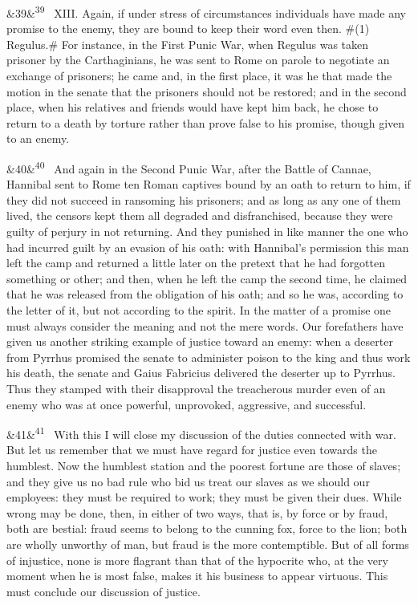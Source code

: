 \documentclass[12pt]{article}
\newcommand{\para}[1][]{\par\noindent\ifx&#1&\else\textsuperscript{\footnotesize #1}~\fi}
\begin{document}
\para[39] XIII. Again, if under stress of circumstances individuals have made any promise to the enemy, they are bound to keep their word even then. \#(1) Regulus.\# For instance, in the First Punic War, when Regulus was taken prisoner by the Carthaginians, he was sent to Rome on parole to negotiate an exchange of prisoners; he came and, in the first place, it was he that made the motion in the senate that the prisoners should not be restored; and in the second place, when his relatives and friends would have kept him back, he chose to return to a death by torture rather than prove false to his promise, though given to an enemy.

\para[40] And again in the Second Punic War, after the Battle of Cannae, Hannibal sent to Rome ten Roman captives bound by an oath to return to him, if they did not succeed in ransoming his prisoners; and as long as any one of them lived, the censors kept them all degraded and disfranchised, because they were guilty of perjury in not returning. And they punished in like manner the one who had incurred guilt by an evasion of his oath: with Hannibal's permission this man left the camp and returned a little later on the pretext that he had forgotten something or other; and then, when he left the camp the second time, he claimed that he was released from the obligation of his oath; and so he was, according to the letter of it, but not according to the spirit. In the matter of a promise one must always consider the meaning and not the mere words. Our forefathers have given us another striking example of justice toward an enemy: when a deserter from Pyrrhus promised the senate to administer poison to the king and thus work his death, the senate and Gaius Fabricius delivered the deserter up to Pyrrhus. Thus they stamped with their disapproval the treacherous murder even of an enemy who was at once powerful, unprovoked, aggressive, and successful.

\para[41] With this I will close my discussion of the duties connected with war. But let us remember that we must have regard for justice even towards the humblest. Now the humblest station and the poorest fortune are those of slaves; and they give us no bad rule who bid us treat our slaves as we should our employees: they must be required to work; they must be given their dues. While wrong may be done, then, in either of two ways, that is, by force or by fraud, both are bestial: fraud seems to belong to the cunning fox, force to the lion; both are wholly unworthy of man, but fraud is the more contemptible. But of all forms of injustice, none is more flagrant than that of the hypocrite who, at the very moment when he is most false, makes it his business to appear virtuous. This must conclude our discussion of justice.
\end{document}
